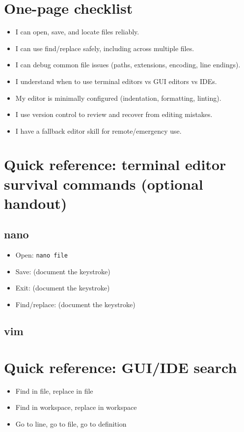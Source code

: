 \section{One-page checklist}
\begin{itemize}
\item I can open, save, and locate files reliably.
\item I can use find/replace safely, including across multiple files.
\item I can debug common file issues (paths, extensions, encoding, line endings).
\item I understand when to use terminal editors vs GUI editors vs IDEs.
\item My editor is minimally configured (indentation, formatting, linting).
\item I use version control to review and recover from editing mistakes.
\item I have a fallback editor skill for remote/emergency use.
\end{itemize}

\section{Quick reference: terminal editor survival commands (optional handout)}
\subsection{nano}
\begin{itemize}
\item Open: \texttt{nano file}
\item Save: (document the keystroke)
\item Exit: (document the keystroke)
\item Find/replace: (document the keystroke)
\end{itemize}

\subsection{vim}

\section{Quick reference: GUI/IDE search}
\begin{itemize}
\item Find in file, replace in file
\item Find in workspace, replace in workspace
\item Go to line, go to file, go to definition
\end{itemize}
